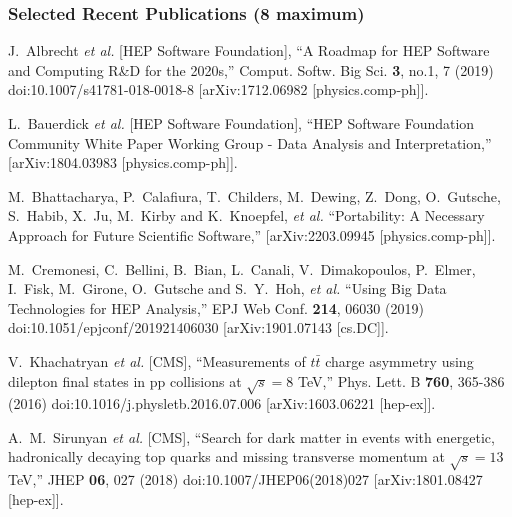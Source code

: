 \documentclass[9pt]{extarticle}
\begin{document}
\subsubsection*{Selected Recent Publications (8 maximum)}

J.~Albrecht \textit{et al.} [HEP Software Foundation],
``A Roadmap for HEP Software and Computing R\&D for the 2020s,''
Comput. Softw. Big Sci. \textbf{3}, no.1, 7 (2019)
doi:10.1007/s41781-018-0018-8
[arXiv:1712.06982 [physics.comp-ph]].

L.~Bauerdick \textit{et al.} [HEP Software Foundation],
``HEP Software Foundation Community White Paper Working Group - Data Analysis and Interpretation,''
[arXiv:1804.03983 [physics.comp-ph]].

M.~Bhattacharya, P.~Calafiura, T.~Childers, M.~Dewing, Z.~Dong, O.~Gutsche, S.~Habib, X.~Ju, M.~Kirby and K.~Knoepfel, \textit{et al.}
``Portability: A Necessary Approach for Future Scientific Software,''
[arXiv:2203.09945 [physics.comp-ph]].

M.~Cremonesi, C.~Bellini, B.~Bian, L.~Canali, V.~Dimakopoulos, P.~Elmer, I.~Fisk, M.~Girone, O.~Gutsche and S.~Y.~Hoh, \textit{et al.}
``Using Big Data Technologies for HEP Analysis,''
EPJ Web Conf. \textbf{214}, 06030 (2019)
doi:10.1051/epjconf/201921406030
[arXiv:1901.07143 [cs.DC]].

V.~Khachatryan \textit{et al.} [CMS],
``Measurements of $t \bar t$ charge asymmetry using dilepton final states in pp collisions at $\sqrt s=8$ TeV,''
Phys. Lett. B \textbf{760}, 365-386 (2016)
doi:10.1016/j.physletb.2016.07.006
[arXiv:1603.06221 [hep-ex]].

A.~M.~Sirunyan \textit{et al.} [CMS],
``Search for dark matter in events with energetic, hadronically decaying top quarks and missing transverse momentum at $ \sqrt{s}=13 $ TeV,''
JHEP \textbf{06}, 027 (2018)
doi:10.1007/JHEP06(2018)027
[arXiv:1801.08427 [hep-ex]].
\end{document}
